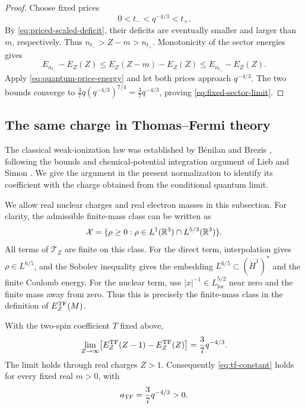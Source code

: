 \begin{proof}
Choose fixed prices
\[
 0<t_-<q^{-4/3}<t_+.
\]
By \cref{eq:priced-scaled-deficit}, their deficits are eventually smaller
and larger than $m$, respectively.  Thus
$n_{t_-}>Z-m>n_{t_+}$.  Monotonicity of the sector energies gives
\[
 E_{n_{t_-}}-E_Z(Z)
       \le E_Z(Z-m)-E_Z(Z)
       \le E_{n_{t_+}}-E_Z(Z).
\]
Apply \cref{eq:quantum-price-energy} and let both prices approach
$q^{-4/3}$.  The two bounds converge to
$\frac37q(q^{-4/3})^{7/4}=\frac37q^{-4/3}$, proving
\cref{eq:fixed-sector-limit}.
\end{proof}

\subsection{The same charge in Thomas--Fermi theory}

The classical weak-ionization law was established by B\'enilan and Brezis
\cite[Section~6, Corollary~5]{BenilanBrezis2004}, following the bounds and
chemical-potential integration argument of Lieb and Simon
\cite[Theorems~IV.11--IV.12]{LiebSimon1977}.
We give the argument in the present normalization to identify its
coefficient with the charge obtained from the conditional quantum limit.

We allow real nuclear charges and real electron masses in this subsection.
For clarity, the admissible finite-mass class can be written as
\[
 \mathcal X=\{\rho\ge0:\rho\in L^1(\mathbb R^3)\cap L^{5/3}(\mathbb R^3)\}.
\]
All terms of $\mathcal T_Z$ are finite on this class.  For the direct term,
interpolation gives $\rho\in L^{6/5}$, and the Sobolev inequality gives the
embedding $L^{6/5}\subset(\dot H^1)^*$ and the finite Coulomb energy.
For the nuclear term, use $|x|^{-1}\in L^{5/2}_{\mathrm{loc}}$ near zero
and the finite mass away from zero.  Thus this is precisely the finite-mass
class in the definition of $E_Z^{\mathrm{TF}}(M)$.

\begin{proposition}\label{prop:tf-identification}
With the two-spin coefficient $T$ fixed above,
\begin{equation}\label{eq:tf-unit-deficit}
 \lim_{Z\to\infty}
       \bigl[E_Z^{\mathrm{TF}}(Z-1)-E_Z^{\mathrm{TF}}(Z)\bigr]
       =\frac37q^{-4/3}.
\end{equation}
The limit holds through real charges $Z>1$.  Consequently
\cref{eq:tf-constant} holds for every fixed real $m>0$, with
\[
 a_{\mathrm{TF}}=\frac37q^{-4/3}>0.
\]
\end{proposition}

